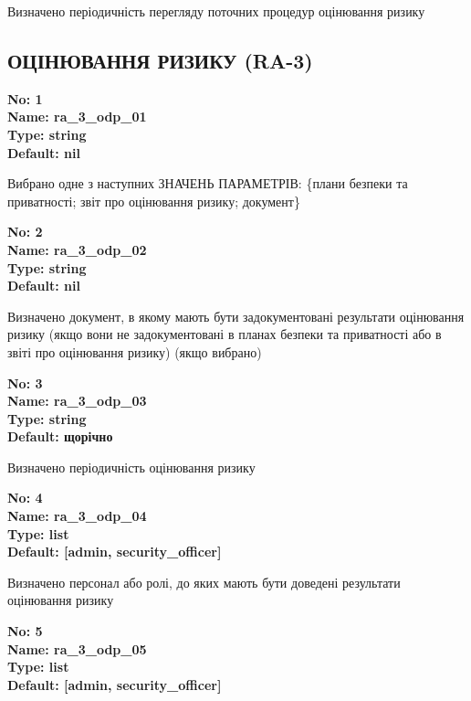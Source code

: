 \documentclass{article}
\begin{document}
{\footnotesize Визначено періодичність перегляду поточних процедур оцінювання ризику}




\subsection{ОЦІНЮВАННЯ РИЗИКУ (RA-3)}


\vspace{10pt}
{\footnotesize\bfseries
No: 1\\
Name: ra\_\allowbreak{}3\_\allowbreak{}odp\_\allowbreak{}01\\
Type: string\\
Default: nil
}

{\footnotesize Вибрано одне з наступних ЗНАЧЕНЬ ПАРАМЕТРІВ: \{плани безпеки та приватності; звіт про оцінювання ризику; документ\}}


{\footnotesize\bfseries
No: 2\\
Name: ra\_\allowbreak{}3\_\allowbreak{}odp\_\allowbreak{}02\\
Type: string\\
Default: nil
}

{\footnotesize Визначено документ, в якому мають бути задокументовані результати оцінювання ризику (якщо вони не задокументовані в планах безпеки та приватності або в звіті про оцінювання ризику) (якщо вибрано)}


{\footnotesize\bfseries
No: 3\\
Name: ra\_\allowbreak{}3\_\allowbreak{}odp\_\allowbreak{}03\\
Type: string\\
Default: \textquotedbl{}щорічно\textquotedbl{}
}

{\footnotesize Визначено періодичність оцінювання ризику}


{\footnotesize\bfseries
No: 4\\
Name: ra\_\allowbreak{}3\_\allowbreak{}odp\_\allowbreak{}04\\
Type: list\\
Default: [\textquotedbl{}admin\textquotedbl{}, \textquotedbl{}security\_\allowbreak{}officer\textquotedbl{}]
}

{\footnotesize Визначено персонал або ролі, до яких мають бути доведені результати оцінювання ризику}


{\footnotesize\bfseries
No: 5\\
Name: ra\_\allowbreak{}3\_\allowbreak{}odp\_\allowbreak{}05\\
Type: list\\
Default: [\textquotedbl{}admin\textquotedbl{}, \textquotedbl{}security\_\allowbreak{}officer\textquotedbl{}]
}
\end{document}
